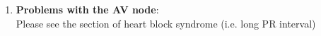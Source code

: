 \documentclass[11pt,a4paper]{report}
\begin{document}
\begin{itemize}
\begin{enumerate}
		\item \textbf{Problems with the AV node}: \\
		Please see the section of heart block syndrome (i.e. long PR interval)

\end{enumerate}
\end{itemize}
\end{document}
